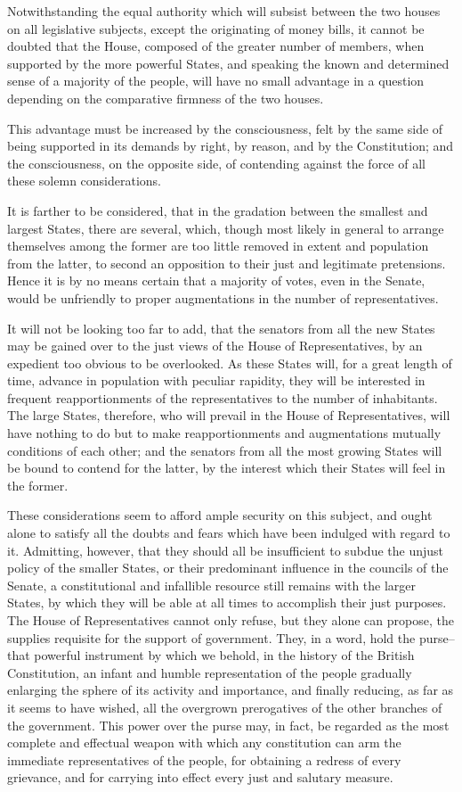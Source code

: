 Notwithstanding the equal authority which will subsist between the two houses on all legislative subjects, except the originating of money bills, it cannot be doubted that the House, composed of the greater number of members, when supported by the more powerful States, and speaking the known and determined sense of a majority of the people, will have no small advantage in a question depending on the comparative firmness of the two houses.

This advantage must be increased by the consciousness, felt by the same side of being supported in its demands by right, by reason, and by the Constitution; and the consciousness, on the opposite side, of contending against the force of all these solemn considerations.

It is farther to be considered, that in the gradation between the smallest and largest States, there are several, which, though most likely in general to arrange themselves among the former are too little removed in extent and population from the latter, to second an opposition to their just and legitimate pretensions. Hence it is by no means certain that a majority of votes, even in the Senate, would be unfriendly to proper augmentations in the number of representatives.

It will not be looking too far to add, that the senators from all the new States may be gained over to the just views of the House of Representatives, by an expedient too obvious to be overlooked. As these States will, for a great length of time, advance in population with peculiar rapidity, they will be interested in frequent reapportionments of the representatives to the number of inhabitants. The large States, therefore, who will prevail in the House of Representatives, will have nothing to do but to make reapportionments and augmentations mutually conditions of each other; and the senators from all the most growing States will be bound to contend for the latter, by the interest which their States will feel in the former.

These considerations seem to afford ample security on this subject, and ought alone to satisfy all the doubts and fears which have been indulged with regard to it. Admitting, however, that they should all be insufficient to subdue the unjust policy of the smaller States, or their predominant influence in the councils of the Senate, a constitutional and infallible resource still remains with the larger States, by which they will be able at all times to accomplish their just purposes. The House of Representatives cannot only refuse, but they alone can propose, the supplies requisite for the support of government. They, in a word, hold the purse--that powerful instrument by which we behold, in the history of the British Constitution, an infant and humble representation of the people gradually enlarging the sphere of its activity and importance, and finally reducing, as far as it seems to have wished, all the overgrown prerogatives of the other branches of the government. This power over the purse may, in fact, be regarded as the most complete and effectual weapon with which any constitution can arm the immediate representatives of the people, for obtaining a redress of every grievance, and for carrying into effect every just and salutary measure.

